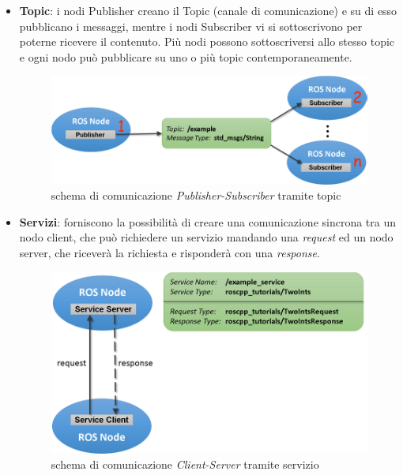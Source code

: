 \begin{itemize}
\item \textbf{Topic}: i nodi Publisher creano il Topic (canale di comunicazione) e su di esso pubblicano i messaggi, mentre i nodi Subscriber vi si sottoscrivono per poterne ricevere il contenuto. 
Più nodi possono sottoscriversi allo stesso topic e ogni nodo può pubblicare su uno o più topic contemporaneamente.
\begin{figure}[h!]
    \centering
    \includegraphics[scale=0.25]{Immagini/topic.png}
    \caption{schema di comunicazione \textit{Publisher-Subscriber} tramite topic}  
    \label{fig:topic}
\end{figure}

\item \textbf{Servizi}: forniscono la possibilità di creare una comunicazione sincrona tra un nodo client, che può richiedere un servizio mandando una \textit{request} ed un nodo server, che riceverà la richiesta e risponderà con una \textit{response}. 
\begin{figure}[h!]
    \centering
    \includegraphics[scale=0.25]{Immagini/servizi.png}
    \caption{schema di comunicazione \textit{Client-Server} tramite servizio}  
    \label{fig:service}
\end{figure}
\end{itemize}


